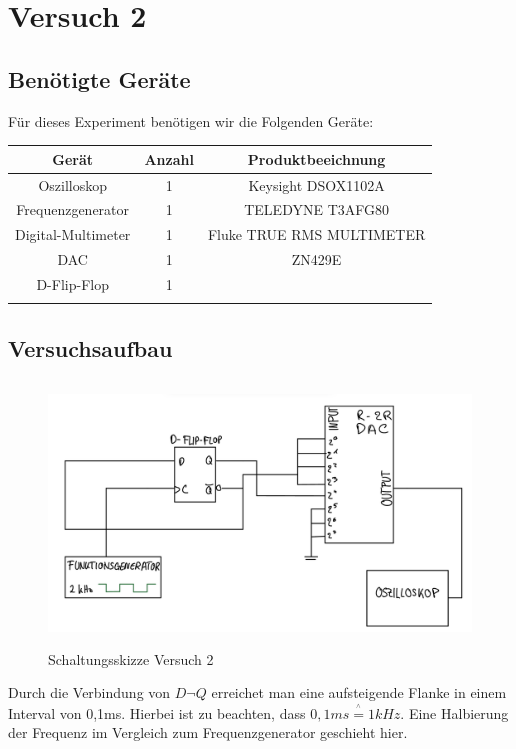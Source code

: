 \chapter{Versuch 2}

\section{Benötigte Geräte}

Für dieses Experiment benötigen wir die Folgenden Geräte:

\begin{tabular}[h]{c|c|c}
    Gerät & Anzahl & Produktbeeichnung\\
    \hline
    Oszilloskop & 1  & Keysight DSOX1102A\\
    \hline
    Frequenzgenerator & 1 & TELEDYNE T3AFG80\\
	\hline 
	Digital-Multimeter & 1 & Fluke TRUE RMS MULTIMETER\\
	\hline
	DAC & 1 & ZN429E \\
	\hline
	D-Flip-Flop & 1 & \\
	\hline
    \label{tab:Materialliste Versuch 2}
\end{tabular}


\section{Versuchsaufbau}
\begin{figure}[H]
	\centering
	\includegraphics[height=7cm]{images/schaltungsskizze-versuch-zwei.jpeg} 
	\caption[]{Schaltungsskizze Versuch 2}
\end{figure}
Durch die Verbindung von $D\neg Q$ erreichet man eine aufsteigende Flanke
in einem Interval von 0,1ms. Hierbei ist zu beachten, dass $0,1ms \stackrel{^\wedge}{=} 1kHz$. 
Eine Halbierung der Frequenz im Vergleich zum Frequenzgenerator geschieht hier.

